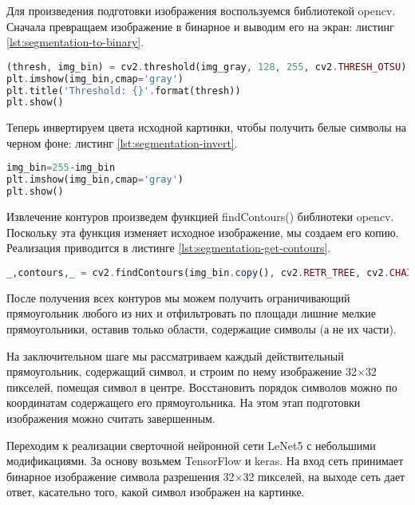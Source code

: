 Для произведения подготовки изображения воспользуемся библиотекой opencv.
Сначала превращаем изображение в бинарное и выводим его на экран: листинг \ref{lst:segmentation-to-binary}.
\begin{lstlisting}[language=PHP,basicstyle=\fontsize{11}{11}\selectfont,tabsize=4,breaklines=true,caption={Преобразование изображения в бинарное.},captionpos=b,label={lst:segmentation-to-binary}]
(thresh, img_bin) = cv2.threshold(img_gray, 128, 255, cv2.THRESH_OTSU)
plt.imshow(img_bin,cmap='gray')
plt.title('Threshold: {}'.format(thresh))
plt.show()
\end{lstlisting}

Теперь инвертируем цвета исходной картинки, чтобы получить белые символы на черном фоне: листинг \ref{lst:segmentation-invert}.
\begin{lstlisting}[language=PHP,basicstyle=\fontsize{11}{11}\selectfont,tabsize=4,breaklines=true,caption={Инвертирование изображения.},captionpos=b,label={lst:segmentation-invert}]
img_bin=255-img_bin
plt.imshow(img_bin,cmap='gray')
plt.show()
\end{lstlisting}

Извлечение контуров произведем функцией findContours() библиотеки opencv. Поскольку эта функция изменяет исходное изображение, мы создаем его копию. Реализация приводится в листинге \ref{lst:segmentation-get-contours}.
\begin{lstlisting}[language=PHP,basicstyle=\fontsize{11}{11}\selectfont,tabsize=4,breaklines=true,caption={Обнаружение контуров.},captionpos=b,label={lst:segmentation-get-contours}]
_,contours,_ = cv2.findContours(img_bin.copy(), cv2.RETR_TREE, cv2.CHAIN_APPROX_SIMPLE)
\end{lstlisting}

После получения всех контуров мы можем получить ограничивающий прямоугольник любого из них и отфильтровать по площади лишние мелкие прямоугольники, оставив только области, содержащие символы (а не их части).

На заключительном шаге мы рассматриваем каждый действительный прямоугольник, содержащий символ, и строим по нему изображение 32$\times$32 пикселей, помещая символ в центре. Восстановить порядок символов можно по координатам содержащего его прямоугольника. На этом этап подготовки изображения можно считать завершенным.

Переходим к реализации сверточной нейронной сети LeNet5 с небольшими модификациями. За основу возьмем TensorFlow и keras. На вход сеть принимает бинарное изображение символа разрешения 32$\times$32 пикселей, на выходе сеть дает ответ, касательно того, какой символ изображен на картинке.

